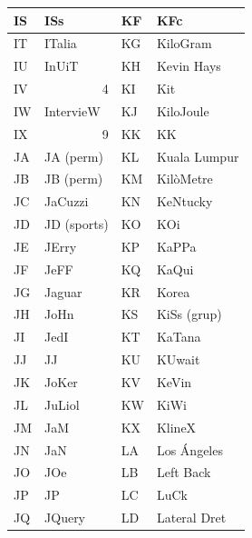 \begin{table}[ht]
    \centering
    \begin{tabular}{|l|l|l|l|}
        \hline
        IS & ISs                    & KF & KFc            \\ \hline
        IT & ITalia                 & KG & KiloGram       \\ \hline
        IU & InUiT                  & KH & Kevin Hays     \\ \hline
        IV & \multicolumn{1}{r|}{4} & KI & Kit            \\ \hline
        IW & IntervieW              & KJ & KiloJoule      \\ \hline
        IX & \multicolumn{1}{r|}{9} & KK & KK             \\ \hline
        JA & JA (perm)              & KL & Kuala Lumpur   \\ \hline
        JB & JB (perm)              & KM & KilòMetre      \\ \hline
        JC & JaCuzzi                & KN & KeNtucky       \\ \hline
        JD & JD (sports)            & KO & KOi            \\ \hline
        JE & JErry                  & KP & KaPPa          \\ \hline
        JF & JeFF                   & KQ & KaQui          \\ \hline
        JG & Jaguar                 & KR & Korea          \\ \hline
        JH & JoHn                   & KS & KiSs  (grup)   \\ \hline
        JI & JedI                   & KT & KaTana         \\ \hline
        JJ & JJ                     & KU & KUwait         \\ \hline
        JK & JoKer                  & KV & KeVin          \\ \hline
        JL & JuLiol                 & KW & KiWi           \\ \hline
        JM & JaM                    & KX & KlineX         \\ \hline
        JN & JaN                    & LA & Los Ángeles    \\ \hline
        JO & JOe                    & LB & Left Back      \\ \hline
        JP & JP                     & LC & LuCk           \\ \hline
        JQ & JQuery                 & LD & Lateral Dret   \\ \hline

\end{tabular}
\end{table}
